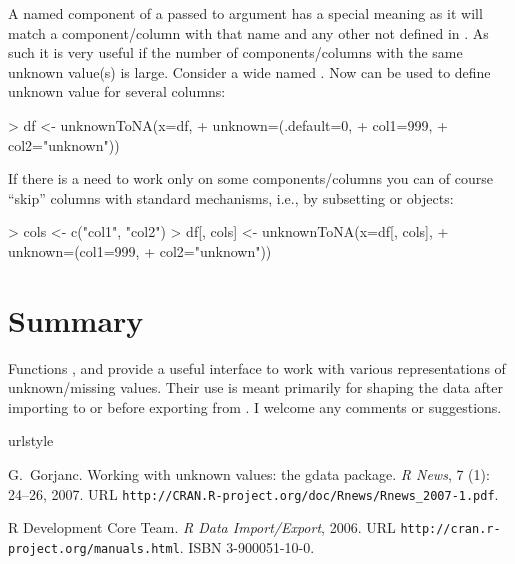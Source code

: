 \documentclass[a4paper]{report}
\begin{document}
\begin{article}
A named component  of a  passed to argument
 has a special meaning as it will match a component/column with
that name and any other not defined in . As such it is very
useful if the number of components/columns with the same unknown value(s)
is large. Consider a wide  named . Now
 can be used to define unknown value for several columns:

\begin{smallverbatim}
> df <- unknownToNA(x=df,
+                   unknown=(.default=0,
+                            col1=999,
+                            col2="unknown"))
\end{smallverbatim}

If there is a need to work only on some components/columns you can of
course ``skip'' columns with standard \R{} mechanisms, i.e.,
by subsetting  or  objects:

\begin{smallverbatim}
> cols <- c("col1", "col2")
> df[, cols] <- unknownToNA(x=df[, cols],
+                           unknown=(col1=999,
+                                    col2="unknown"))
\end{smallverbatim}

\section{Summary}

Functions ,  and 
provide a useful interface to work with various representations of
unknown/missing values. Their use is meant primarily for shaping the data
after importing to or before exporting from \R{}. I welcome any comments or
suggestions.

% 

\begin{thebibliography}{1}
\providecommand{\natexlab}[1]{#1}
\providecommand{\url}[1]{\texttt{#1}}
\expandafter\ifx\csname urlstyle\endcsname\relax
  \providecommand{\doi}[1]{doi: #1}\else
  \providecommand{\doi}{doi: \begingroup \urlstyle{rm}\Url}\fi

G.~Gorjanc.
\newblock Working with unknown values: the gdata package.
\newblock \emph{R News}, 7 (1): 24--26, 2007.
\newblock URL \url{http://CRAN.R-project.org/doc/Rnews/Rnews_2007-1.pdf}.

{R Development Core Team}.
\newblock \emph{R Data Import/Export}, 2006.
\newblock URL \url{http://cran.r-project.org/manuals.html}.
\newblock ISBN 3-900051-10-0.


\end{thebibliography}
\end{article}
\end{document}
